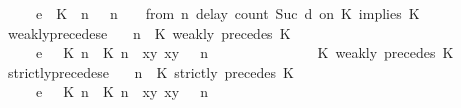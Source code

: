 \begin{isabellebody}
\ \ \ \ \ {\isasymhookrightarrow}\isactrlsub e\ \ {\isacharparenleft}{\isacharparenleft}{\isacharparenleft}K\ {\isasymUp}\ n{\isacharparenright}\ {\isacharhash}\ {\isasymGamma}{\isacharparenright}{\isacharcomma}\ n\ {\isasymturnstile}\ {\isasymPsi}\ {\isasymtriangleright}\ {\isacharparenleft}{\isacharparenleft}from\ n\ delay\ count\ {\isacharparenleft}Suc\ d{\isacharparenright}\ on\ K\ implies\ K\ {\isacharhash}\ {\isasymPhi}{\isacharparenright}{\isacharparenright}{\isacartoucheclose}\isanewline
{\isacharbar}\ weakly{\isacharunderscore}precedes{\isacharunderscore}e{\isacharcolon}\isanewline
%
\isanewline
\ \ {\isacartoucheopen}{\isacharparenleft}{\isasymGamma}{\isacharcomma}\ n\ {\isasymturnstile}\ {\isacharparenleft}{\isacharparenleft}K\ weakly\ precedes\ K\ {\isacharhash}\ {\isasymPsi}{\isacharparenright}\ {\isasymtriangleright}\ {\isasymPhi}{\isacharparenright}\isanewline
\ \ \ \ \ {\isasymhookrightarrow}\isactrlsub e\ \ {\isacharparenleft}{\isacharparenleft}{\isacharparenleft}{\isasymlceil}{\isacharhash}\isactrlsup {\isasymle}\ K\ n{\isacharcomma}\ {\isacharhash}\isactrlsup {\isasymle}\ K\ n{\isasymrceil}\ {\isasymin}\ {\isacharparenleft}{\isasymlambda}{\isacharparenleft}x{\isacharcomma}y{\isacharparenright}{\isachardot}\ x{\isasymle}y{\isacharparenright}{\isacharparenright}\ {\isacharhash}\ {\isasymGamma}{\isacharparenright}{\isacharcomma}\ n\isanewline
\ \ \ \ \ \ \ \ \ \ \ \ {\isasymturnstile}\ {\isasymPsi}\ {\isasymtriangleright}\ {\isacharparenleft}{\isacharparenleft}K\ weakly\ precedes\ K\ {\isacharhash}\ {\isasymPhi}{\isacharparenright}{\isacharparenright}{\isacartoucheclose}\isanewline
{\isacharbar}\ strictly{\isacharunderscore}precedes{\isacharunderscore}e{\isacharcolon}\isanewline
%
\isanewline
\ \ {\isacartoucheopen}{\isacharparenleft}{\isasymGamma}{\isacharcomma}\ n\ {\isasymturnstile}\ {\isacharparenleft}{\isacharparenleft}K\ strictly\ precedes\ K\ {\isacharhash}\ {\isasymPsi}{\isacharparenright}\ {\isasymtriangleright}\ {\isasymPhi}{\isacharparenright}\isanewline
\ \ \ \ \ {\isasymhookrightarrow}\isactrlsub e\ \ {\isacharparenleft}{\isacharparenleft}{\isacharparenleft}{\isasymlceil}{\isacharhash}\isactrlsup {\isasymle}\ K\ n{\isacharcomma}\ {\isacharhash}\isactrlsup {\isacharless}\ K\ n{\isasymrceil}\ {\isasymin}\ {\isacharparenleft}{\isasymlambda}{\isacharparenleft}x{\isacharcomma}y{\isacharparenright}{\isachardot}\ x{\isasymle}y{\isacharparenright}{\isacharparenright}\ {\isacharhash}\ {\isasymGamma}{\isacharparenright}{\isacharcomma}\ n\isanewline

\end{isabellebody}
